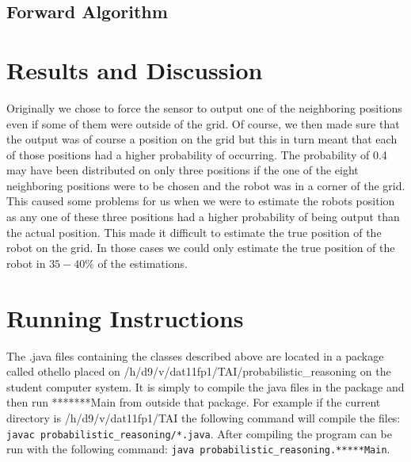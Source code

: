 \documentclass[a4paper]{article}
\begin{document}
\subsection{Forward Algorithm}
\label{for_alg}


\section{Results and Discussion}
Originally we chose to force the sensor to output one of the neighboring positions even if some of them were outside of the grid. Of course, we then made sure that the output was of course a position on the grid but this in turn meant that each of those positions had a higher probability of occurring. The probability of 0.4 may have been distributed on only three positions if the one of the eight neighboring positions were to be chosen and the robot was in a corner of the grid. This caused some problems for us when we were to estimate the robots position as any one of these three positions had a higher probability of being output than the actual position. This made it difficult to estimate the true position of the robot on the grid. In those cases we could only estimate the true position of the robot in $35 - 40\%$ of the estimations.

\section{Running Instructions} The .java files containing the classes described
above are located in a package called othello placed on
/h/d9/v/dat11fp1/TAI/probabilistic\_reasoning on the student computer system. It
is simply to compile the java files in the package and then run *******Main from
outside that package. For example if the current directory is
/h/d9/v/dat11fp1/TAI the following command will compile the files: \texttt{javac
probabilistic\_reasoning/*.java}. After compiling the program can be run with
the following command: \texttt{java probabilistic\_reasoning.*****Main}.

\end{document}

